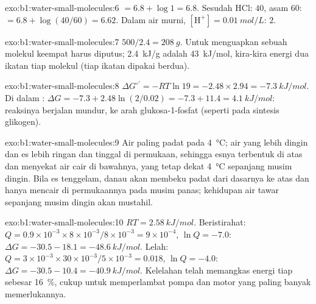 \begin{solution}{exo:b1:water-small-molecules:6}
 $= 6.8 + \log 1 = 6.8$. Sesudah HCl:  $40$, asam $60$:  $= 6.8 +
\log(40/60) = 6.62$. Dalam air murni, $[\mathrm{H^+}] = \qty{0.01}{mol/L}$:
 $2$.
\end{solution}

\begin{solution}{exo:b1:water-small-molecules:7}
$500/2.4 = \qty{208}{g}$. Untuk menguapkan sebuah molekul keempat  harus diputus; \qty{2.4}{kJ/g} adalah \qty{43}{kJ/mol},
kira-kira energi dua ikatan tiap molekul (tiap ikatan dipakai berdua).
\end{solution}

\begin{solution}{exo:b1:water-small-molecules:8}
$\Delta G^{\circ\prime} = -RT\ln 19 = -2.48\times 2.94 =
\qty{-7.3}{kJ/mol}$. Di dalam : $\Delta G = -7.3 + 2.48\ln(2/0.02) =
-7.3 + 11.4 = \qty{+4.1}{kJ/mol}$: reaksinya berjalan mundur, ke arah
glukosa-1-fosfat (seperti pada sintesis glikogen).
\end{solution}

\begin{solution}{exo:b1:water-small-molecules:9}
Air paling padat pada \qty{4}{\celsius}; air yang lebih dingin dan es
lebih ringan dan tinggal di permukaan, sehingga esnya terbentuk di atas
dan menyekat air cair di bawahnya, yang tetap dekat \qty{4}{\celsius}
sepanjang musim dingin. Bila es tenggelam, danau akan membeku padat dari
dasarnya ke atas dan hanya mencair di permukaannya pada musim panas;
kehidupan air tawar sepanjang musim dingin akan mustahil.
\end{solution}

\begin{solution}{exo:b1:water-small-molecules:10}
$RT = \qty{2.58}{kJ/mol}$. Beristirahat: $Q = 0.9\times 10^{-3}\times 8\times
10^{-3}/8\times 10^{-3} = 9\times 10^{-4}$, $\ln Q = -7.0$: $\Delta G =
-30.5 - 18.1 = \qty{-48.6}{kJ/mol}$. Lelah: $Q = 3\times 10^{-3}\times
30\times 10^{-3}/5\times 10^{-3} = 0.018$, $\ln Q = -4.0$: $\Delta G =
-30.5 - 10.4 = \qty{-40.9}{kJ/mol}$. Kelelahan telah memangkas energi
tiap  sebesar \qty{16}{\%}, cukup untuk memperlambat pompa dan motor
yang paling banyak memerlukannya.
\end{solution}

